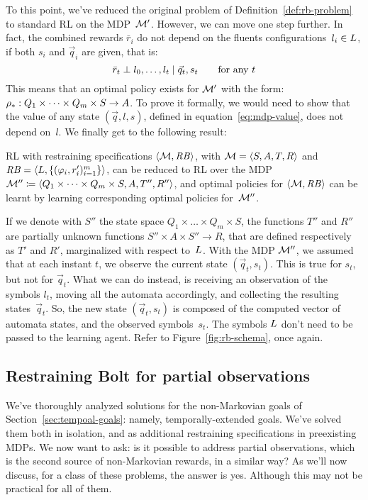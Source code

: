 To this point, we've reduced the original problem of
Definition~\ref{def:rb-problem} to standard RL on the MDP~$\mathcal{M}'$. However,
we can move one step further. In fact, the combined rewards $\bar{r}_i$ do not
depend on the fluents configurations~$l_i \in L$, if both $s_i$
and $\vec{q}_i$ are given, that is:
\[
	\bar{r}_t \perp l_0, \dots, l_t \mid \vec{q}_t, s_t \qquad
	\text{for any $t$}
\]
This means that an optimal policy exists for $\mathcal{M}'$ with the form:
${\rho}_*: Q_1 \times \dots \times Q_m \times S \to A$.
To prove it formally, we would need to show that the value of any state
$(\vec{q}, l, s)$, defined in equation~\eqref{eq:mdp-value}, does not depend
on~$l$. We finally get to the following result:
\begin{theorem}
	\cite{bib:bolt} RL with \ldl{} restraining specifications
	$\langle \mathcal{M}, \text{\textit{RB}} \rangle$, with $\mathcal{M} = \langle S, A, T,
	R \rangle$ and $\text{\textit{RB}} = \langle L, \{(\varphi_i,
	r_i')_{i=1}^m\} \rangle$, can be reduced to RL over the MDP $\mathcal{M}'' \coloneqq
	\langle Q_1 \times \dots \times Q_m \times S, A, T'', R''\rangle$,
	and optimal policies for $\langle \mathcal{M}, \text{\textit{RB}} \rangle$ can be learnt
	by learning corresponding optimal policies for~$\mathcal{M}''$.
	\label{th:bolt-equivalence}
\end{theorem}
If we denote with $S''$ the state space $Q_1 \times \dots \times Q_m \times
S$, the functions $T''$ and $R''$ are partially unknown functions $S'' \times
A \times S'' \to R$, that are defined respectively as $T'$ and $R'$,
marginalized with respect to~$L$. With the MDP $\mathcal{M}''$, we assumed
that at each instant $t$, we observe the current state $(\vec{q}_t, s_t)$.
This is true for $s_t$, but not for $\vec{q}_t$. What we can do instead, is
receiving an observation of the symbols $l_t$, moving all the automata
accordingly, and collecting the resulting states~$\vec{q}_t$. So, the new
state $(\vec{q}_t, s_t)$ is composed of the computed vector of automata
states, and the observed symbols~$s_t$. The symbols $L$ don't need
to be passed to the learning agent. Refer to Figure~\ref{fig:rb-schema}, once
again.


\subsection{Restraining Bolt for partial observations}

\label{sec:rb-for-partial-obs}

We've thoroughly analyzed solutions for the non-Markovian goals of
Section~\ref{sec:tempoal-goals}: namely, temporally-extended goals. We've
solved them both in isolation, and as additional restraining specifications in
preexisting MDPs. We now want to ask: is it possible to address partial
observations, which is the second source of non-Markovian rewards, in a
similar way? As we'll now discuss, for a class of these problems, the answer
is yes. Although this may not be practical for all of them.

